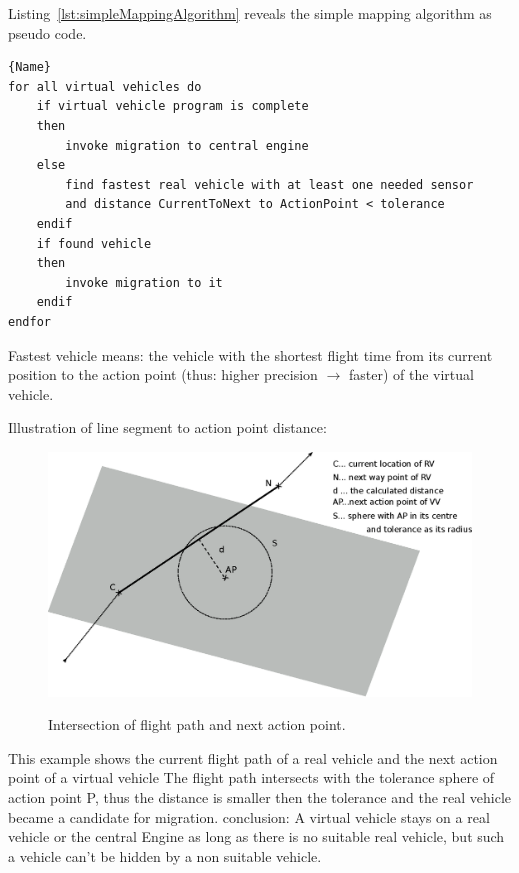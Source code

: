 Listing~\ref{lst:simpleMappingAlgorithm} reveals the simple mapping algorithm as pseudo code. 

\lstset{tabsize=3,language=PseudoCode}
\begin{lstlisting}[caption={Simple Mapping Algorithm},mathescape=true,label=lst:simpleMappingAlgorithm]{Name}
for all virtual vehicles do
	if virtual vehicle program is complete
	then
		invoke migration to central engine
	else
		find fastest real vehicle with at least one needed sensor
		and distance CurrentToNext to ActionPoint < tolerance
	endif
	if found vehicle 
	then 
		invoke migration to it 
	endif
endfor
\end{lstlisting}

Fastest vehicle means: the vehicle with the shortest flight time from its current position to the action point (thus: higher precision \begin{math} \rightarrow \end{math} faster)
of the virtual vehicle. 


Illustration of line segment to action point distance:
\begin{figure}[h]
	\begin{center}
		{
            \includegraphics[width=12cm]{dist.eps}
        }
	\end{center}
	\caption{Intersection of flight path and next action point.\label{fig:intersection example}}
\end{figure}
This example shows the current flight path of a real vehicle and the next action point of a virtual vehicle
The flight path intersects with the tolerance sphere of action point P, thus the distance is smaller then the tolerance and
the real vehicle became a candidate for migration.
%
conclusion:
A virtual vehicle stays on a real vehicle or the central Engine as long as there is no suitable real vehicle, but such a vehicle can't 
be hidden by a non suitable vehicle.
